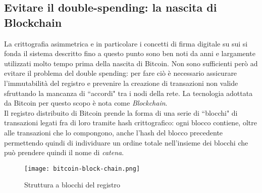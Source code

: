 	\subsection{Evitare il double-spending: la nascita di Blockchain}
		La crittografia asimmetrica e in particolare i concetti di firma digitale su sui si fonda il sistema descritto fino a questo punto sono ben noti da anni e largamente utilizzati molto tempo prima della nascita di Bitcoin. Non sono sufficienti però ad evitare il problema del double spending: per fare ciò è necessario assicurare l'immutabilità del registro e prevenire la creazione di transazioni non valide sfruttando la mancanza di ``accordi" tra i nodi della rete. La tecnologia adottata da Bitcoin per questo scopo è nota come \emph{Blockchain}. \\
		Il registro distribuito di Bitcoin prende la forma di una serie di ``blocchi" di transazioni legati fra di loro tramite hash crittografico: ogni blocco contiene, oltre alle transazioni che lo compongono, anche l'hash del blocco precedente permettendo quindi di individuare un ordine totale nell'insieme dei blocchi che può prendere quindi il nome di \emph{catena}. 
		\begin{figure}[ht]
			\centering
			\texttt{[image: bitcoin-block-chain.png]}
			\caption{Struttura a blocchi del registro}
			\label{fig:bitcoin_chain}
		\end{figure}

